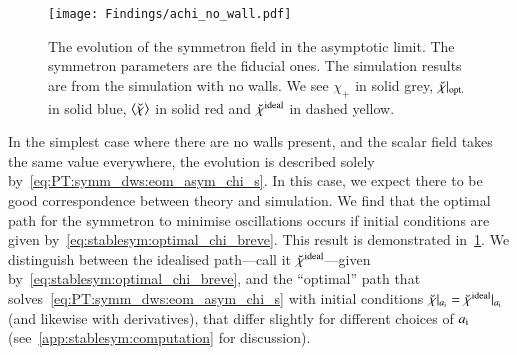 

\newcommand{\brchi}{\breve{\chi}}



\begin{figure}[h]
    \centering
    \texttt{[image: Findings/achi\_no\_wall.pdf]}
    \caption{The evolution of the symmetron field in the asymptotic limit. The symmetron parameters are the fiducial ones. The simulation results are from the simulation with no walls. We see $\chi_+$ in solid grey, $\brchi\rvert\ped{opt.}$ in solid blue, $\avg{\brchi}$ in solid red and $\brchi\ap{ideal}$ in dashed yellow.}
    \label{fig:results:achi:achi_no_wall}
\end{figure}
In the simplest case where there are no walls present, and the scalar field takes the same value everywhere, the evolution is described solely by~\cref{eq:PT:symm_dws:eom_asym_chi_s}. In this case, we expect there to be good correspondence between theory and simulation. We find that the optimal path for the symmetron to minimise oscillations occurs if initial conditions are given by~\cref{eq:stablesym:optimal_chi_breve}. This result is demonstrated in~\cref{fig:results:achi:achi_no_wall}. 
We distinguish between the idealised path---call it $\brchi\ap{ideal}$---given by~\cref{eq:stablesym:optimal_chi_breve}, and the ``optimal'' path that solves~\cref{eq:PT:symm_dws:eom_asym_chi_s} with initial conditions $\brchi\rvert_{a\ped{i}} = \brchi\ap{ideal}\rvert_{a\ped{i}}$ (and likewise with derivatives), that differ slightly for different choices of $a_\mathrm{i}$ (see~\cref{app:stablesym:computation} for discussion). 



